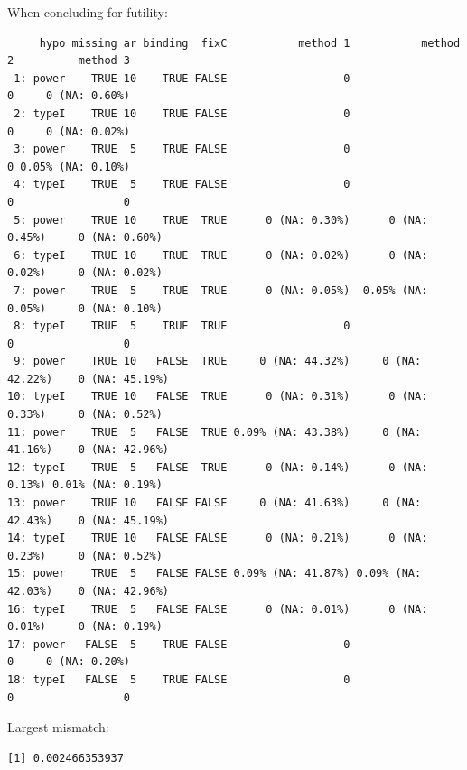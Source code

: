 \documentclass[12pt]{article}
\begin{document}
When concluding for futility:
\begin{verbatim}
     hypo missing ar binding  fixC           method 1           method 2          method 3
 1: power    TRUE 10    TRUE FALSE                  0                  0     0 (NA: 0.60%)
 2: typeI    TRUE 10    TRUE FALSE                  0                  0     0 (NA: 0.02%)
 3: power    TRUE  5    TRUE FALSE                  0                  0 0.05% (NA: 0.10%)
 4: typeI    TRUE  5    TRUE FALSE                  0                  0                 0
 5: power    TRUE 10    TRUE  TRUE      0 (NA: 0.30%)      0 (NA: 0.45%)     0 (NA: 0.60%)
 6: typeI    TRUE 10    TRUE  TRUE      0 (NA: 0.02%)      0 (NA: 0.02%)     0 (NA: 0.02%)
 7: power    TRUE  5    TRUE  TRUE      0 (NA: 0.05%)  0.05% (NA: 0.05%)     0 (NA: 0.10%)
 8: typeI    TRUE  5    TRUE  TRUE                  0                  0                 0
 9: power    TRUE 10   FALSE  TRUE     0 (NA: 44.32%)     0 (NA: 42.22%)    0 (NA: 45.19%)
10: typeI    TRUE 10   FALSE  TRUE      0 (NA: 0.31%)      0 (NA: 0.33%)     0 (NA: 0.52%)
11: power    TRUE  5   FALSE  TRUE 0.09% (NA: 43.38%)     0 (NA: 41.16%)    0 (NA: 42.96%)
12: typeI    TRUE  5   FALSE  TRUE      0 (NA: 0.14%)      0 (NA: 0.13%) 0.01% (NA: 0.19%)
13: power    TRUE 10   FALSE FALSE     0 (NA: 41.63%)     0 (NA: 42.43%)    0 (NA: 45.19%)
14: typeI    TRUE 10   FALSE FALSE      0 (NA: 0.21%)      0 (NA: 0.23%)     0 (NA: 0.52%)
15: power    TRUE  5   FALSE FALSE 0.09% (NA: 41.87%) 0.09% (NA: 42.03%)    0 (NA: 42.96%)
16: typeI    TRUE  5   FALSE FALSE      0 (NA: 0.01%)      0 (NA: 0.01%)     0 (NA: 0.19%)
17: power   FALSE  5    TRUE FALSE                  0                  0     0 (NA: 0.20%)
18: typeI   FALSE  5    TRUE FALSE                  0                  0                 0
\end{verbatim}


Largest mismatch:
\begin{verbatim}
[1] 0.002466353937
\end{verbatim}
\end{document}
